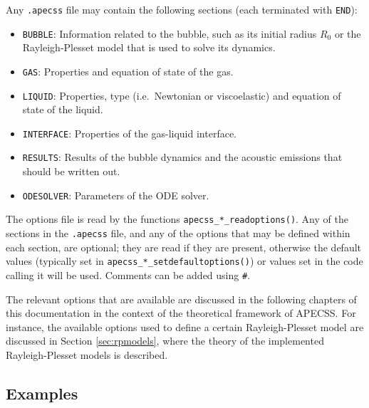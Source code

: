 Any {\tt *.apecss} file may contain the following sections (each terminated with {\tt END}):
\vspace{-1em}
\begin{itemize}[noitemsep]
  \item {\tt BUBBLE}: Information related to the bubble, such as its initial radius $R_0$ or the Rayleigh-Plesset model that is used to solve its dynamics.
  \item {\tt GAS}: Properties and equation of state of the gas.
  \item {\tt LIQUID}: Properties, type (i.e.~Newtonian or viscoelastic) and equation of state of the liquid.
  \item {\tt INTERFACE}: Properties of the gas-liquid interface. 
  \item {\tt RESULTS}: Results of the bubble dynamics and the acoustic emissions that should be written out.
  \item {\tt ODESOLVER}: Parameters of the ODE solver.
\end{itemize}
The options file is read by the functions {\tt apecss\_*\_readoptions()}. Any of the sections in the {\tt *.apecss} file, and any of the options that may be defined within each section, are optional; they are read if they are present, otherwise the default values (typically set in {\tt apecss\_*\_setdefaultoptions()}) or values set in the code calling it will be used. Comments can be added using {\tt \#}.

The relevant options that are available are discussed in the following chapters of this documentation in the context of the theoretical framework of APECSS. For instance, the available options used to define a certain Rayleigh-Plesset model are discussed in Section \ref{sec:rpmodels}, where the theory of the implemented Rayleigh-Plesset models is described. 

\subsection{Examples}

